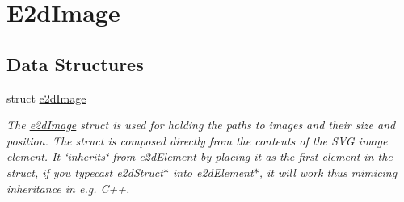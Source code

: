 \hypertarget{group__e2d_image}{\section{E2d\-Image}
\label{group__e2d_image}
}
\subsection*{Data Structures}
\begin{DoxyCompactItemize}
\item 
struct \hyperlink{structe2d_image}{e2d\-Image}
\begin{DoxyCompactList}\small\item\em The \hyperlink{structe2d_image}{e2d\-Image} struct is used for holding the paths to images and their size and position. The struct is composed directly from the contents of the S\-V\-G image element. It \char`\"{}inherits\char`\"{} from \hyperlink{structe2d_element}{e2d\-Element} by placing it as the first element in the struct, if you typecast e2d\-Struct$\ast$ into e2d\-Element$\ast$, it will work thus mimicing inheritance in e.\-g. C++. \end{DoxyCompactList}\end{DoxyCompactItemize}

